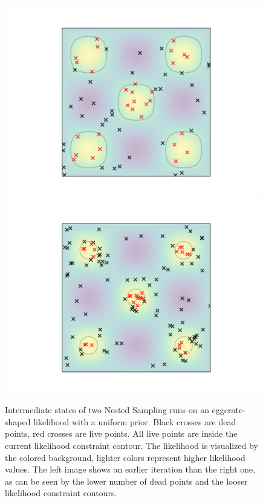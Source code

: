 \documentclass[12pt, a4paper]{report}
\begin{document}
\begin{figure}
    \centering
    \includegraphics[trim={3cm 1cm 2.4cm 1cm}, clip, scale=0.65]{figs/ns_eggcrate_example_1.png}
    \includegraphics[trim={2.4cm 1cm 3cm 1cm}, clip, scale=0.65]{figs/ns_eggcrate_example_2.png}
    \caption{Intermediate states of two Nested Sampling runs on an eggcrate-shaped likelihood with a uniform prior. Black crosses are dead points, red crosses are live points. All live points are inside the current likelihood constraint contour. The likelihood is visualized by the colored background, lighter colors represent higher likelihood values. The left image shows an earlier iteration than the right one, as can be seen by the lower number of dead points and the looser likelihood constraint contours.}
    \label{fig:ns_eggcrate_example}
\end{figure}
\end{document}
